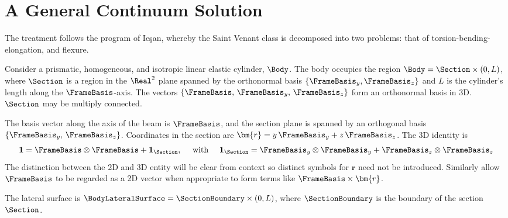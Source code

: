 
\section{A General Continuum Solution}

The treatment follows the program of Ie\c{s}an, whereby the Saint Venant class is decomposed into two problems: that of torsion-bending-elongation, and flexure.


Consider a prismatic, homogeneous, and isotropic linear elastic cylinder, $\Body$. 
The body occupies the region $\Body = \Section \times (0, L)$, where $\Section$ is a region in the $\Real^2$ plane spanned by the orthonormal basis $\{\FrameBasis_y, \FrameBasis_z\}$ and $L$ is the cylinder's length along the $\FrameBasis$-axis. 
The vectors \(\{\FrameBasis,\,\FrameBasis_y,\,\FrameBasis_z\}\) form an orthonormal basis in 3D.
$\Section$ may be multiply connected. 

The basis vector along the axis of the beam is $\FrameBasis$, and the section plane is spanned by an orthogonal basis $\{\FrameBasis_y,\,\FrameBasis_z\}$. 
Coordinates in the section are $\bm{r} = y\,\FrameBasis_y + z\,\FrameBasis_z$. 
The 3D identity is 
\[\mathbf{1} = \FrameBasis \otimes \FrameBasis + \mathbf{1}_\Section,
\quad\text{ with }\quad 
\mathbf{1}_\Section = \FrameBasis_y \otimes \FrameBasis_y + \FrameBasis_z \otimes \FrameBasis_z
\]
The distinction between the 2D and 3D entity will be clear from context so distinct symbols for $\bm{r}$ need not be introduced. Similarly allow $\FrameBasis$ to be regarded as a 2D vector when appropriate to form terms like $\FrameBasis\times\bm{r}$. 

The lateral surface is $\BodyLateralSurface = \SectionBoundary \times (0, L)$, where $\SectionBoundary$ is the boundary of the section $\Section$. 


